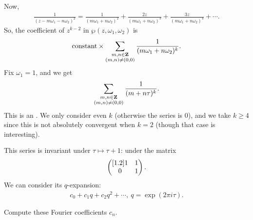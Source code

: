 \documentclass[11pt, oneside,margin=1in]{article}
\begin{document}
\begin{example}
Now,
\begin{align*}
	\frac{1}{(z-m\omega_1-n\omega_2)^2} = \frac{1}{(m\omega_1+n\omega_2)^2} + \frac{2z}{(m\omega_1+n\omega_2)^3} + \frac{3z}{(m\omega_1+n\omega_2)^4} + \cdots.
\end{align*}
So, the coefficient of $z^{k-2}$ in $\wp(z,\omega_1,\omega_2)$ is
\begin{align*}
	\textrm{constant} \times \sum_{\substack{m,n\in \mathbf Z\\(m,n)\ne (0,0)}}^{} \frac{1}{(m\omega_1+n\omega_2) ^k}.
\end{align*}
Fix $\omega_1=1$, and we get
\begin{align*}
	\sum_{\substack{m,n\in \mathbf Z\\(m,n)\ne (0,0)}}^{} \frac{1}{(m+n\tau)^k}.
\end{align*}
This is an . We only consider even $k$ (otherwise the series is $0$), and we take $k\ge 4$ since this is not absolutely convergent when $k=2$ (though that case is interesting).

This series is invariant under $\tau \longmapsto \tau+1$: under the matrix
 \begin{align*}
	 \begin{pmatrix} [ 1.2 ] 1&1\\0&1\end{pmatrix}.
\end{align*}
We can consider its $q$-expansion:
\begin{align*}
	c_0 + c_1q + c_2q^2 + \cdots,\ q=\exp(2\pi i\tau).
\end{align*}
\begin{problem}
	Compute these Fourier coefficients $c_n$.
\end{problem}
\end{example}
\end{document}
